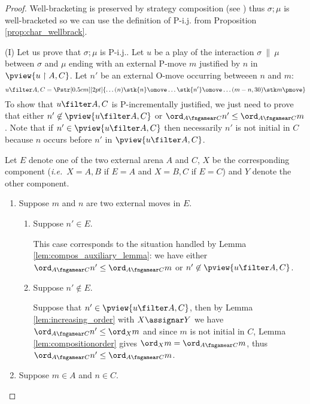 \begin{proof}
Well-bracketing is preserved by strategy composition (see \cite[Proposition 2.5]{abramsky94full}) thus
$\sigma ; \mu$ is well-bracketed so we can use the definition of P-i.j. from Proposition \ref{prop:char_wellbrack}.

\noindent (I) Let us prove that $\sigma ; \mu$ is P-i.j..
Let $u$ be a play of the interaction $\sigma\ \|\ \mu$ between $\sigma$ and $\mu$
ending with an external P-move $m$
justified by $n$ in $\pview{u \upharpoonright A , C}$.
Let $n'$ be an external O-move occurring betweeen $n$ and $m$:
$$ u \filter A,C =
\Pstr[0.5cm][2pt]{ \ldots (n){\stk {n} \omove}  \ldots
 {\stk {n'} \omove}  \ldots  (m-n,30){\stk m \pmove}
}
$$
To show that $u \filter A,C$ is P-incrementally justified, we just need to prove that either $n'\not\in \pview{u \filter A,C}$ or $\ord_{A\fngamear C} n' \leq \ord_{A\fngamear C} m$.
Note that if $n'\in \pview{u \filter A,C}$
then necessarily $n'$ is not initial
in $C$ because $n$ occurs before $n'$ in
$\pview{u \filter A,C}$.

Let $E$ denote one of the two external arena $A$ and $C$, $X$ be the  corresponding component ({\it i.e.}~$X=A,B$ if $E=A$ and $X=B,C$ if $E=C$) and $Y$ denote the other component.
    \begin{enumerate}[1)]
    \item Suppose $m$ and $n$ are two external moves in $E$.

        \begin{enumerate}[{1}.a)]
        \item Suppose $n' \in E$.

        This case corresponds to the situation handled by Lemma \ref{lem:compos_auxiliary_lemma}: we have either $\ord_{A\fngamear C} n' \leq \ord_{A\fngamear C} m$
        or $n' \not\in \pview{u \filter A,C}$.

        \item Suppose $n' \not\in E$.

        Suppose that $n' \in \pview{u\filter A,C}$, then by
        Lemma \ref{lem:increasing_order} with $X\assignar Y$ we have $ \ord_{A\fngamear C} n'  \leq \ord_X m$
        and since $m$ is not initial in $C$, Lemma \ref{lem:compositionorder} gives $\ord_X m = \ord_{A\fngamear C} m$, thus $\ord_{A\fngamear C} n' \leq \ord_{A\fngamear C} m$.
        \end{enumerate}

        \item \label{case:mA} Suppose $m \in A$ and $n \in C$.


\end{enumerate}
\end{proof}
